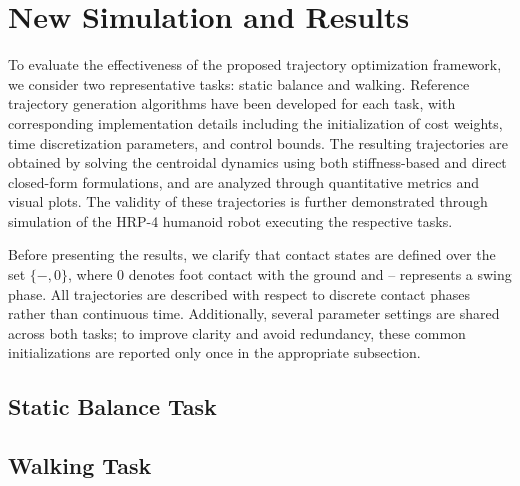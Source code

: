 \documentclass[main.tex]{subfiles}
\begin{document}
\section{New Simulation and Results}
\label{sec:newsimulation}
To evaluate the effectiveness of the proposed trajectory optimization framework, we consider two representative tasks: static balance and walking. Reference trajectory generation algorithms have been developed for each task, with corresponding implementation details including the initialization of cost weights, time discretization parameters, and control bounds. The resulting trajectories are obtained by solving the centroidal dynamics using both stiffness-based and direct closed-form formulations, and are analyzed through quantitative metrics and visual plots. The validity of these trajectories is further demonstrated through simulation of the HRP-4 humanoid robot executing the respective tasks.

Before presenting the results, we clarify that contact states are defined over the set $\{-, 0\}$, where $0$ denotes foot contact with the ground and $–$ represents a swing phase. All trajectories are described with respect to discrete contact phases rather than continuous time. Additionally, several parameter settings are shared across both tasks; to improve clarity and avoid redundancy, these common initializations are reported only once in the appropriate subsection.
\subsection{Static Balance Task}




\subsection{Walking Task}
\end{document}
